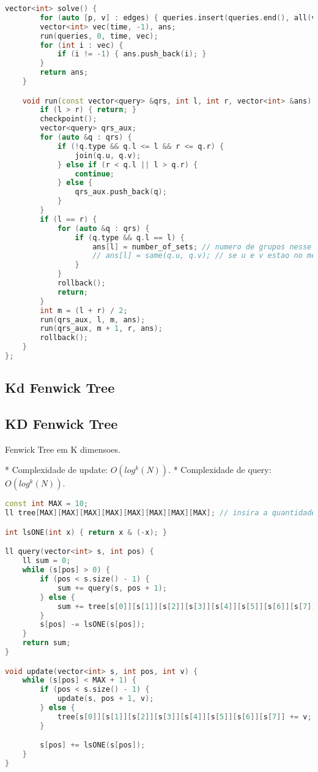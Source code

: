 \documentclass[11pt, a4paper, twoside]{article}
\begin{document}
\begin{lstlisting}[language=C++]
    vector<int> solve() {
        for (auto [p, v] : edges) { queries.insert(queries.end(), all(v)); }
        vector<int> vec(time, -1), ans;
        run(queries, 0, time, vec);
        for (int i : vec) {
            if (i != -1) { ans.push_back(i); }
        }
        return ans;
    }

    void run(const vector<query> &qrs, int l, int r, vector<int> &ans) {
        if (l > r) { return; }
        checkpoint();
        vector<query> qrs_aux;
        for (auto &q : qrs) {
            if (!q.type && q.l <= l && r <= q.r) {
                join(q.u, q.v);
            } else if (r < q.l || l > q.r) {
                continue;
            } else {
                qrs_aux.push_back(q);
            }
        }
        if (l == r) {
            for (auto &q : qrs) {
                if (q.type && q.l == l) {
                    ans[l] = number_of_sets; // numero de grupos nesse tempo
                    // ans[l] = same(q.u, q.v); // se u e v estao no mesmo grupo
                }
            }
            rollback();
            return;
        }
        int m = (l + r) / 2;
        run(qrs_aux, l, m, ans);
        run(qrs_aux, m + 1, r, ans);
        rollback();
    }
};
\end{lstlisting}

\subsection{Kd Fenwick Tree}


\subsection{KD Fenwick Tree}



Fenwick Tree em K dimensoes.

* Complexidade de update: $O(log^k(N))$.
* Complexidade de query: $O(log^k(N))$.
\begin{lstlisting}[language=C++]
const int MAX = 10;
ll tree[MAX][MAX][MAX][MAX][MAX][MAX][MAX][MAX]; // insira a quantidade necessaria de dimensoes

int lsONE(int x) { return x & (-x); }

ll query(vector<int> s, int pos) {
    ll sum = 0;
    while (s[pos] > 0) {
        if (pos < s.size() - 1) {
            sum += query(s, pos + 1);
        } else {
            sum += tree[s[0]][s[1]][s[2]][s[3]][s[4]][s[5]][s[6]][s[7]];
        }
        s[pos] -= lsONE(s[pos]);
    }
    return sum;
}

void update(vector<int> s, int pos, int v) {
    while (s[pos] < MAX + 1) {
        if (pos < s.size() - 1) {
            update(s, pos + 1, v);
        } else {
            tree[s[0]][s[1]][s[2]][s[3]][s[4]][s[5]][s[6]][s[7]] += v;
        }

        s[pos] += lsONE(s[pos]);
    }
}\end{lstlisting}
\end{document}
